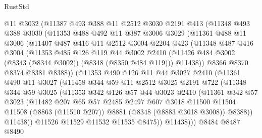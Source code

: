 \begin{lexlean}{RustStd}
\begin{coremodule}
      @11
      @3032
      (@11387
        @493
        @388
        @11
        @2512
        @3030
        @2191
        @413
        (@11348
          @493
          @388
          @3030
          (@11353
            @488
            @492
            @11
            @387
            @3006
            @3029
            (@11361
              @488
              @11
              @3006
              (@11407
                @487
                @416
                @11
                @2512
                @3004
                @2204
                @423
                (@11348
                  @487
                  @416
                  @3004
                  (@11353
                    @485
                    @126
                    @119
                    @44
                    @3002
                    @2410
                    (@11426 @484 @3002 (@8343 (@8344 @3002)) (@8348 (@8350 @484 @119)))
                    @11438))
                @8366
                @8370
                @8374
                @8381
                @8388))
            (@11353
              @490
              @126
              @11
              @44
              @3027
              @2410
              (@11361
                @490
                @11
                @3027
                (@11458
                  @344
                  @59
                  @11
                  @2512
                  @3025
                  @2191
                  @722
                  (@11348
                    @344
                    @59
                    @3025
                    (@11353
                      @342
                      @126
                      @57
                      @44
                      @3023
                      @2410
                      (@11361
                        @342
                        @57
                        @3023
                        (@11482
                          @207
                          @65
                          @57
                          @2485
                          @2497
                          @607
                          @3018
                          @11500
                          @11504
                          @11508
                          (@8863 (@11510 @207))
                          @8881
                          (@8348 (@8883 @3018 @3008))
                          @8388))
                      @11438))
                  @11526
                  @11529
                  @11532
                  @11535
                  @8475))
              @11438)))
        @8484
        @8487
        @8490

\end{coremodule}
\end{lexlean}
